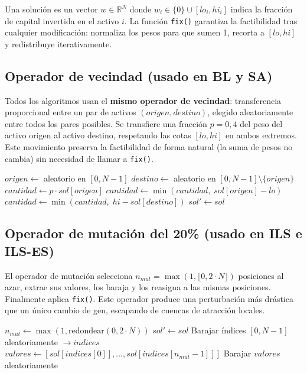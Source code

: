 \documentclass[12pt,a4paper]{article}
\begin{document}
Una solución es un vector $w \in \mathbb{R}^N$ donde $w_i \in \{0\} \cup [lo_i, hi_i]$ indica
la fracción de capital invertida en el activo $i$.
La función \texttt{fix()} garantiza la factibilidad tras cualquier modificación:
normaliza los pesos para que sumen 1, recorta a $[lo, hi]$ y redistribuye iterativamente.

\subsection{Operador de vecindad (usado en BL y SA)}

Todos los algoritmos usan el \textbf{mismo operador de vecindad}: transferencia proporcional
entre un par de activos $(origen, destino)$, elegido aleatoriamente entre todos los pares
posibles. Se transfiere una fracción $p=0{,}4$ del peso del activo origen al activo destino,
respetando las cotas $[lo, hi]$ en ambos extremos. Este movimiento preserva la factibilidad
de forma natural (la suma de pesos no cambia) sin necesidad de llamar a \texttt{fix()}.

\begin{algorithm}[H]
\caption{generarVecino($sol$, problema, $p=0{,}4$)}
$origen \leftarrow$ aleatorio en $[0, N-1]$\;
$destino \leftarrow$ aleatorio en $[0, N-1] \setminus \{origen\}$\;
$cantidad \leftarrow p\cdot sol[origen]$\;
$cantidad \leftarrow \min(cantidad,\; sol[origen]-lo)$\;
$cantidad \leftarrow \min(cantidad,\; hi-sol[destino])$\;
$sol' \leftarrow sol$\;
\end{algorithm}

\subsection{Operador de mutación del 20\% (usado en ILS e ILS-ES)}

El operador de mutación selecciona $n_{mut} = \max(1,\lfloor 0{,}2\cdot N\rfloor)$ posiciones
al azar, extrae sus valores, los baraja y los reasigna a las mismas posiciones.
Finalmente aplica \texttt{fix()}. Este operador produce una perturbación más drástica que
un único cambio de gen, escapando de cuencas de atracción locales.

\begin{algorithm}[H]
\caption{mutar20\%($sol$, problema)}
$n_{mut} \leftarrow \max(1, \text{redondear}(0{,}2 \cdot N))$\;
$sol' \leftarrow sol$\;
Barajar índices $[0,N-1]$ aleatoriamente $\to indices$\;
$valores \leftarrow [sol[indices[0]], \ldots, sol[indices[n_{mut}-1]]]$\;
Barajar $valores$ aleatoriamente\;
\;
\end{algorithm}
\end{document}
